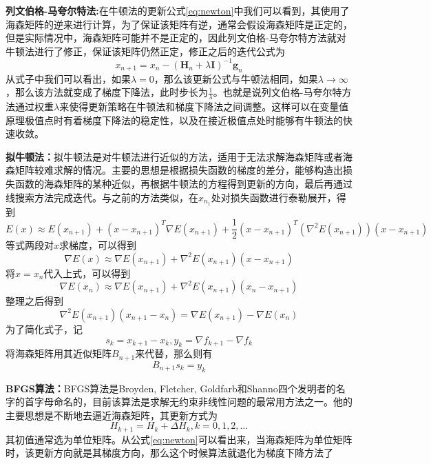 \textbf{列文伯格-马夸尔特法:}在牛顿法的更新公式\ref{eq:newton}中我们可以看到，其使用了海森矩阵的逆来进行计算，为了保证该矩阵有逆，通常会假设海森矩阵是正定的，但是实际情况中，海森矩阵可能并不是正定的，因此列文伯格-马夸尔特方法就对牛顿法进行了修正，保证该矩阵仍然正定，修正之后的迭代公式为
\begin{equation}
    x_{n+1} = x_n - (\mathbf{H}_n + \lambda \mathbf{I})^{-1} \mathbf { g } _ { n }
\end{equation}
从式子中我们可以看出，如果\(\lambda = 0\)，那么该更新公式与牛顿法相同，如果\(\lambda \rightarrow \infty\)，那么该方法就变成了梯度下降法，此时步长为\(\frac{1}{\lambda}\)。也就是说列文伯格-马夸尔特方法通过权重\(\lambda\)来使得更新策略在牛顿法和梯度下降法之间调整。这样可以在变量值原理极值点时有着梯度下降法的稳定性，以及在接近极值点处时能够有牛顿法的快速收敛。



\textbf{拟牛顿法：}拟牛顿法是对牛顿法进行近似的方法，适用于无法求解海森矩阵或者海森矩阵较难求解的情况。主要的思想是根据损失函数的梯度的差分，能够构造出损失函数的海森矩阵的某种近似，再根据牛顿法的方程得到更新的方向，最后再通过线搜索方法完成迭代。与之前的方法类似，在\(x_{n_1}\)处对损失函数进行泰勒展开，得到
\begin{equation}
    E(x) \approx E(x_{n+1}) + (x - x_{n+1}) ^T \nabla E(x_{n+1}) + \frac{1}{2}(x-x_{n+1})^T (\nabla^2 E(x_{n+1}))(x-x_{n+1})
\end{equation}
等式两段对\(x\)求梯度，可以得到
\begin{equation}
    \nabla E(x) \approx \nabla E(x_{n+1}) +\nabla^2 E(x_{n+1})(x-x_{n+1})    
\end{equation}
将\(x = x_n\)代入上式，可以得到
\begin{equation}
    \nabla E(x_n) \approx \nabla E(x_{n+1}) +\nabla^2 E(x_{n+1})(x_n-x_{n+1})    
\end{equation}
整理之后得到
\begin{equation}
    \nabla^2 E(x_{n+1})(x_{n+1} - x_n)  = \nabla E(x_{n+1}) - \nabla E(x_n)
\end{equation}
为了简化式子，记
\begin{equation}
    s_k=x_{k+1}-x_k, y_k=\nabla f_{k+1}-\nabla f_k
\end{equation}
将海森矩阵用其近似矩阵\(B_{n+1}\)来代替，那么则有
\begin{equation}
    B_{n+1}s_k = y_k
\end{equation}


\textbf{BFGS算法：}BFGS算法是Broyden, Fletcher, Goldfarb和Shanno四个发明者的名字的首字母命名的，目前该算法是求解无约束非线性问题的最常用方法之一。他的主要思想是不断地去逼近海森矩阵，其更新方式为
\begin{equation}
    H_{k+1} = H_k + \Delta H_k, k=0,1,2,\ldots
\end{equation}
其初值通常选为单位矩阵。从公式\ref{eq:newton}可以看出来，当海森矩阵为单位矩阵时，该更新方向就是其梯度方向，那么这个时候算法就退化为梯度下降方法了


